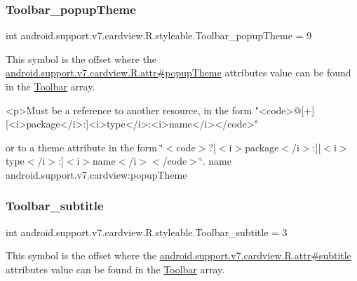 \subsubsection{\texorpdfstring{Toolbar\+\_\+popup\+Theme}{Toolbar\_popupTheme}}
{\footnotesize\ttfamily int android.\+support.\+v7.\+cardview.\+R.\+styleable.\+Toolbar\+\_\+popup\+Theme = 9\hspace{0.3cm}{\ttfamily [static]}}

This symbol is the offset where the \hyperlink{classandroid_1_1support_1_1v7_1_1cardview_1_1R_1_1attr_a6361a1d29dba71235a7925dc34e36e20}{android.\+support.\+v7.\+cardview.\+R.\+attr\#popup\+Theme} attribute\textquotesingle{}s value can be found in the \hyperlink{classandroid_1_1support_1_1v7_1_1cardview_1_1R_1_1styleable_a26149aeb8fd339abe09ecc9d92b9304f}{Toolbar} array.

\begin{DoxyVerb}      <p>Must be a reference to another resource, in the form "<code>@[+][<i>package</i>:]<i>type</i>:<i>name</i></code>"
\end{DoxyVerb}
 or to a theme attribute in the form \char`\"{}$<$code$>$?\mbox{[}$<$i$>$package$<$/i$>$\+:\mbox{]}\mbox{[}$<$i$>$type$<$/i$>$\+:\mbox{]}$<$i$>$name$<$/i$>$$<$/code$>$\char`\"{}.  name android.\+support.\+v7.\+cardview\+:popup\+Theme \mbox{\label{classandroid_1_1support_1_1v7_1_1cardview_1_1R_1_1styleable_a15786fa791e3f7056cf296b7dc084793}} 
\subsubsection{\texorpdfstring{Toolbar\+\_\+subtitle}{Toolbar\_subtitle}}
{\footnotesize\ttfamily int android.\+support.\+v7.\+cardview.\+R.\+styleable.\+Toolbar\+\_\+subtitle = 3\hspace{0.3cm}{\ttfamily [static]}}

This symbol is the offset where the \hyperlink{classandroid_1_1support_1_1v7_1_1cardview_1_1R_1_1attr_a05ab66196223ffd287bd23667d4122cd}{android.\+support.\+v7.\+cardview.\+R.\+attr\#subtitle} attribute\textquotesingle{}s value can be found in the \hyperlink{classandroid_1_1support_1_1v7_1_1cardview_1_1R_1_1styleable_a26149aeb8fd339abe09ecc9d92b9304f}{Toolbar} array.

